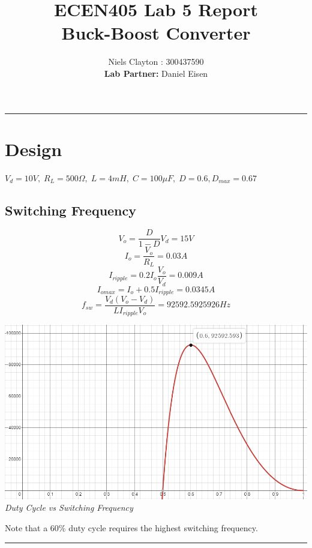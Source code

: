 \documentclass[a4paper,11pt]{article}
\begin{document}
\begin{preview}
\title{\LARGE{\textbf{ECEN405 Lab 5 Report\\Buck-Boost Converter}}}
\author{Niels Clayton : 300437590\\\textbf{Lab Partner:} Daniel Eisen}
\date{}
\maketitle
\hrule

\section{Design}
    $V_d=10V,\; R_L=500\Omega,\; L=4mH,\; C=100\mu F,\; D=0.6, D_{max} = 0.67$
        \subsection*{Switching Frequency}
            $$V_{o}=\frac{D}{1-D}V_{d}=15V$$
            $$I_{o}=\frac{V_{o}}{R_{L}}=0.03A$$
            $$I_{ripple}=0.2I_{o}\frac{V_{o}}{V_{d}}=0.009A$$
            $$I_{omax}=I_{o}+0.5I_{ripple}=0.0345A$$
            $$f_{sw}=\frac{V_{d}\left(V_{o}-V_{d}\right)}{LI_{ripple}V_{o}} = 92592.5925926Hz$$
            \begin{center}
                \includegraphics[width=1\textwidth]{frequency.png}\\
                \textit{Duty Cycle vs Switching Frequency}
            \end{center}
            Note that a 60\% duty cycle requires the highest switching frequency.\\

\hrule


\end{preview}
\end{document}
